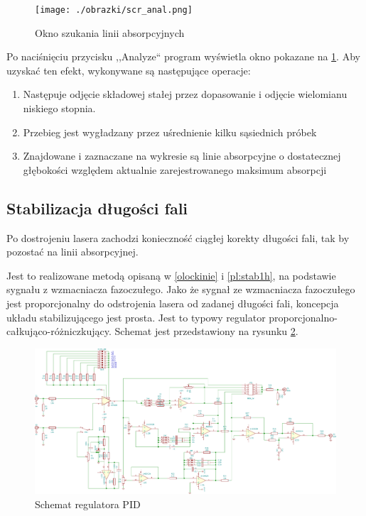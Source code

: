 \documentclass[a4paper,10pt,twoside]{article}
\begin{document}
\begin{figure}
\begin{center}
 \texttt{[image: ./obrazki/scr\_anal.png]}
\end{center}
\caption{Okno szukania linii absorpcyjnych}
\label{scr-anal}
\end{figure}

Po naciśnięciu przycisku ,,Analyze`` program wyświetla okno pokazane na \ref{scr-anal}.
Aby uzyskać ten efekt, wykonywane są następujące operacje:
\begin{enumerate}
 \item Następuje odjęcie składowej stałej przez dopasowanie i odjęcie wielomianu niskiego stopnia.
 \item Przebieg jest wygładzany przez uśrednienie kilku sąsiednich próbek
 \item Znajdowane i zaznaczane na wykresie są linie absorpcyjne o dostatecznej głębokości względem aktualnie zarejestrowanego maksimum absorpcji
\end{enumerate}





\subsection{Stabilizacja długości fali}

Po dostrojeniu lasera zachodzi konieczność ciągłej korekty długości fali, tak by pozostać na linii absorpcyjnej.

Jest to realizowane metodą opisaną w \ref{olockinie} i \ref{pl:stab1h}, na podstawie sygnału z wzmacniacza fazoczułego. %
Jako że sygnał ze wzmacniacza fazoczułego jest proporcjonalny do odstrojenia lasera od zadanej długości fali, koncepcja układu stabilizującego jest prosta.
Jest to typowy regulator proporcjonalno-całkująco-różniczkujący. Schemat jest przedstawiony na rysunku \ref{sch-pid}.

\begin{figure}
\begin{center}
 \includegraphics[scale=0.58, angle =90 ]{./obrazki/pidella.pdf}
\end{center}
\caption{Schemat regulatora PID}
\label{sch-pid}
\end{figure}
\end{document}
